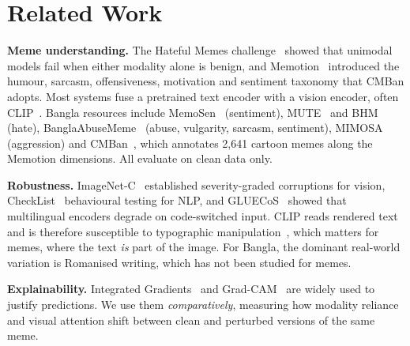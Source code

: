 \section{Related Work}
\label{sec:related}

\textbf{Meme understanding.} The Hateful Memes challenge~\cite{kiela2020hateful} showed that unimodal models fail when
either modality alone is benign, and Memotion~\cite{sharma2020memotion} introduced the humour, sarcasm, offensiveness,
motivation and sentiment taxonomy that CMBan adopts. Most systems fuse a pretrained text encoder with a vision
encoder, often CLIP~\cite{radford2021clip}. Bangla resources include MemoSen~\cite{hossain2022memosen} (sentiment),
MUTE~\cite{hossain2022mute} and BHM~\cite{hossain2024bhm} (hate), BanglaAbuseMeme~\cite{das2023banglaabusememe}
(abuse, vulgarity, sarcasm, sentiment), MIMOSA~\cite{ahsan2024mimosa} (aggression) and CMBan~\cite{cmban2025}, which
annotates 2{,}641 cartoon memes along the Memotion dimensions. All evaluate on clean data only.

\textbf{Robustness.} ImageNet-C~\cite{hendrycks2019benchmarking} established severity-graded corruptions for vision,
CheckList~\cite{ribeiro2020checklist} behavioural testing for NLP, and GLUECoS~\cite{khanuja2020gluecos} showed that
multilingual encoders degrade on code-switched input. CLIP reads rendered text and is therefore susceptible to
typographic manipulation~\cite{goh2021multimodal}, which matters for memes, where the text \emph{is} part of the
image. For Bangla, the dominant real-world variation is Romanised writing, which has not been studied for memes.

\textbf{Explainability.} Integrated Gradients~\cite{sundararajan2017ig} and
Grad-CAM~\cite{selvaraju2017gradcam,chattopadhay2018gradcampp} are widely used to justify predictions. We use them
\emph{comparatively}, measuring how modality reliance and visual attention shift between clean and perturbed versions
of the same meme.
